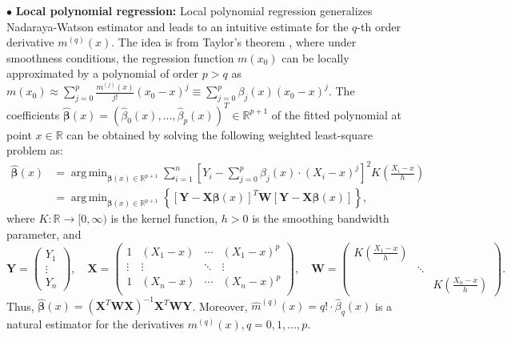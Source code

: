 \documentclass{uwstat572}
\theoremstyle{definition}
\DeclareMathOperator*{\argmin}{arg\,min}
\renewcommand{\hat}{\widehat}
\theoremstyle{theorem}
\begin{document}
$\bullet$ {\bf Local polynomial regression:} Local polynomial regression \citep{fan1996local} generalizes Nadaraya-Watson estimator and leads to an intuitive estimate for the $q$-th order derivative $m^{(q)}(x)$. The idea is from Taylor's theorem \citep{rudin1976principles}, where under smoothness conditions, the regression function $m(x_0)$ can be locally approximated by a polynomial of order $p>q$ as $
m(x_0)\approx \sum_{j=0}^p \frac{m^{(j)}(x)}{j!}(x_0-x)^j \equiv \sum_{j=0}^p \beta_j(x)\left(x_0-x\right)^j.$ 
The coefficients $\hat{\bm{\beta}}(x)=\left(\hat{\beta}_0(x),...,\hat{\beta}_p(x)\right)^T\in \mathbb{R}^{p+1}$ of the fitted polynomial at point $x\in \mathbb{R}$ can be obtained by solving the following weighted least-square problem as:
\begin{equation}
\label{loc_pol}
\begin{split}
\hat{\bm{\beta}}(x) &=\argmin_{\bm{\beta}(x)\in \mathbb{R}^{p+1}} \sum_{i=1}^n \left[Y_i - \sum_{j=0}^p \beta_j(x)\cdot (X_i -x)^j \right]^2 K\left(\frac{X_i-x}{h}\right) \\
&= \argmin_{\bm{\beta}(x)\in \mathbb{R}^{p+1}} \left\{\left[\bm{Y} - \bm{X}\bm{\beta}(x)\right]^T \bm{W} \left[\bm{Y} - \bm{X}\bm{\beta}(x)\right] \right\},
\end{split}
\end{equation}
where $K:\mathbb{R}\to [0,\infty)$ is the kernel function, $h>0$ is the smoothing bandwidth parameter, and  
$$\bm{Y} = \begin{pmatrix}
Y_1\\
\vdots\\
Y_n
\end{pmatrix}, \quad \bm{X} = \begin{pmatrix}
1 & (X_1-x) & \cdots & (X_1-x)^p\\
\vdots & \vdots & \ddots & \vdots\\
1 & (X_n-x) & \cdots & (X_n-x)^p\\
\end{pmatrix}, \quad \bm{W} = \begin{pmatrix}
K\left(\frac{X_1-x}{h}\right) & & \\
& \ddots & \\
& & K\left(\frac{X_n-x}{h}\right)
\end{pmatrix}.$$
Thus, $\hat{\bm{\beta}}(x) = \left(\bm{X}^T\bm{W}\bm{X}\right)^{-1} \bm{X}^T \bm{W}\bm{Y}$. Moreover, $\hat{m}^{(q)}(x) = q!\cdot\hat{\beta}_q(x)$ is a natural estimator for the derivatives $m^{(q)}(x), q=0,1,...,p$. 
\end{document}

